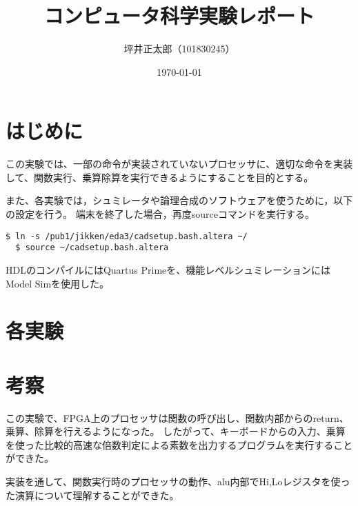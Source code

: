 \documentclass[a4j,15pt]{jsarticle}
\begin{document}
\title{コンピュータ科学実験レポート}
\author{坪井正太郎（101830245）}
\date{\today}
\maketitle

\section*{はじめに}
この実験では、一部の命令が実装されていないプロセッサに、適切な命令を実装して、関数実行、乗算除算を実行できるようにすることを目的とする。

また、各実験では，シュミレータや論理合成のソフトウェアを使うために，以下の設定を行う。
端末を終了した場合，再度sourceコマンドを実行する。
\begin{lstlisting}[caption={設定の読み込み},label={設定の読み込み}]
  $ ln -s /pub1/jikken/eda3/cadsetup.bash.altera ~/
  $ source ~/cadsetup.bash.altera
\end{lstlisting}

HDLのコンパイルにはQuartus Primeを、機能レベルシュミレーションにはModel Simを使用した。

\section*{各実験}









\section*{考察}
この実験で、FPGA上のプロセッサは関数の呼び出し、関数内部からのreturn、乗算、除算を行えるようになった。
したがって、キーボードからの入力、乗算を使った比較的高速な倍数判定による素数を出力するプログラムを実行することができた。

実装を通して、関数実行時のプロセッサの動作、alu内部でHi,Loレジスタを使った演算について理解することができた。
\end{document}
